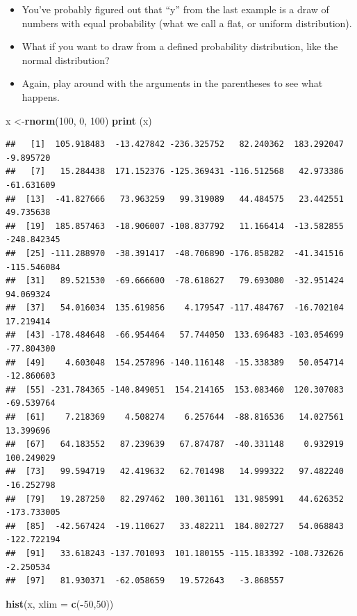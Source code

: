 \documentclass[]{book}
\newenvironment{Shaded}{\begin{snugshade}}{\end{snugshade}}
\newcommand{\DataTypeTok}[1]{\textcolor[rgb]{0.13,0.29,0.53}{#1}}
\newcommand{\DecValTok}[1]{\textcolor[rgb]{0.00,0.00,0.81}{#1}}
\newcommand{\KeywordTok}[1]{\textcolor[rgb]{0.13,0.29,0.53}{\textbf{#1}}}
\newcommand{\NormalTok}[1]{#1}
\newcommand{\OperatorTok}[1]{\textcolor[rgb]{0.81,0.36,0.00}{\textbf{#1}}}
\begin{document}
\begin{itemize}
\item
  You've probably figured out that ``y'' from the last example is a draw of numbers with equal probability (what we call a flat, or uniform distribution).
\item
  What if you want to draw from a defined probability distribution, like the normal distribution?
\item
  Again, play around with the arguments in the parentheses to see what happens.
\end{itemize}

\begin{Shaded}
\begin{Highlighting}[]
\NormalTok{x <-}\KeywordTok{rnorm}\NormalTok{(}\DecValTok{100}\NormalTok{, }\DecValTok{0}\NormalTok{, }\DecValTok{100}\NormalTok{)}
\KeywordTok{print}\NormalTok{ (x)}
\end{Highlighting}
\end{Shaded}

\begin{verbatim}
##   [1]  105.918483  -13.427842 -236.325752   82.240362  183.292047   -9.895720
##   [7]   15.284438  171.152376 -125.369431 -116.512568   42.973386  -61.631609
##  [13]  -41.827666   73.963259   99.319089   44.484575   23.442551   49.735638
##  [19]  185.857463  -18.906007 -108.837792   11.166414  -13.582855 -248.842345
##  [25] -111.288970  -38.391417  -48.706890 -176.858282  -41.341516 -115.546084
##  [31]   89.521530  -69.666600  -78.618627   79.693080  -32.951424   94.069324
##  [37]   54.016034  135.619856    4.179547 -117.484767  -16.702104   17.219414
##  [43] -178.484648  -66.954464   57.744050  133.696483 -103.054699  -77.804300
##  [49]    4.603048  154.257896 -140.116148  -15.338389   50.054714  -12.860603
##  [55] -231.784365 -140.849051  154.214165  153.083460  120.307083  -69.539764
##  [61]    7.218369    4.508274    6.257644  -88.816536   14.027561   13.399696
##  [67]   64.183552   87.239639   67.874787  -40.331148    0.932919  100.249029
##  [73]   99.594719   42.419632   62.701498   14.999322   97.482240  -16.252798
##  [79]   19.287250   82.297462  100.301161  131.985991   44.626352 -173.733005
##  [85]  -42.567424  -19.110627   33.482211  184.802727   54.068843 -122.722194
##  [91]   33.618243 -137.701093  101.180155 -115.183392 -108.732626   -2.250534
##  [97]   81.930371  -62.058659   19.572643   -3.868557
\end{verbatim}

\begin{Shaded}
\begin{Highlighting}[]
\KeywordTok{hist}\NormalTok{(x, }\DataTypeTok{xlim =} \KeywordTok{c}\NormalTok{(}\OperatorTok{-}\DecValTok{50}\NormalTok{,}\DecValTok{50}\NormalTok{))}
\end{Highlighting}
\end{Shaded}
\end{document}
